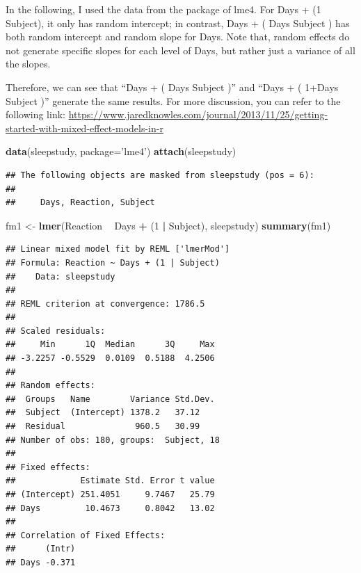 \documentclass[]{book}
\newenvironment{Shaded}{\begin{snugshade}}{\end{snugshade}}
\newcommand{\KeywordTok}[1]{\textcolor[rgb]{0.13,0.29,0.53}{\textbf{#1}}}
\newcommand{\DataTypeTok}[1]{\textcolor[rgb]{0.13,0.29,0.53}{#1}}
\newcommand{\DecValTok}[1]{\textcolor[rgb]{0.00,0.00,0.81}{#1}}
\newcommand{\StringTok}[1]{\textcolor[rgb]{0.31,0.60,0.02}{#1}}
\newcommand{\OperatorTok}[1]{\textcolor[rgb]{0.81,0.36,0.00}{\textbf{#1}}}
\newcommand{\NormalTok}[1]{#1}
\begin{document}
In the following, I used the data from the package of lme4. For Days +
(1 \textbar{} Subject), it only has random intercept; in contrast, Days
+ ( Days\textbar{} Subject ) has both random intercept and random slope
for Days. Note that, random effects do not generate specific slopes for
each level of Days, but rather just a variance of all the slopes.

Therefore, we can see that ``Days + ( Days\textbar{} Subject )'' and
``Days + ( 1+Days\textbar{} Subject )'' generate the same results. For
more discussion, you can refer to the following link:
\url{https://www.jaredknowles.com/journal/2013/11/25/getting-started-with-mixed-effect-models-in-r}

\begin{Shaded}
\begin{Highlighting}[]
\KeywordTok{data}\NormalTok{(sleepstudy, }\DataTypeTok{package=}\StringTok{'lme4'}\NormalTok{)}
\KeywordTok{attach}\NormalTok{(sleepstudy)}
\end{Highlighting}
\end{Shaded}

\begin{verbatim}
## The following objects are masked from sleepstudy (pos = 6):
## 
##     Days, Reaction, Subject
\end{verbatim}

\begin{Shaded}
\begin{Highlighting}[]
\NormalTok{fm1 <-}\StringTok{ }\KeywordTok{lmer}\NormalTok{(Reaction }\OperatorTok{~}\StringTok{ }\NormalTok{Days }\OperatorTok{+}\StringTok{ }\NormalTok{(}\DecValTok{1} \OperatorTok{|}\StringTok{ }\NormalTok{Subject), sleepstudy)}
\KeywordTok{summary}\NormalTok{(fm1)}
\end{Highlighting}
\end{Shaded}

\begin{verbatim}
## Linear mixed model fit by REML ['lmerMod']
## Formula: Reaction ~ Days + (1 | Subject)
##    Data: sleepstudy
## 
## REML criterion at convergence: 1786.5
## 
## Scaled residuals: 
##     Min      1Q  Median      3Q     Max 
## -3.2257 -0.5529  0.0109  0.5188  4.2506 
## 
## Random effects:
##  Groups   Name        Variance Std.Dev.
##  Subject  (Intercept) 1378.2   37.12   
##  Residual              960.5   30.99   
## Number of obs: 180, groups:  Subject, 18
## 
## Fixed effects:
##             Estimate Std. Error t value
## (Intercept) 251.4051     9.7467   25.79
## Days         10.4673     0.8042   13.02
## 
## Correlation of Fixed Effects:
##      (Intr)
## Days -0.371
\end{verbatim}
\end{document}
